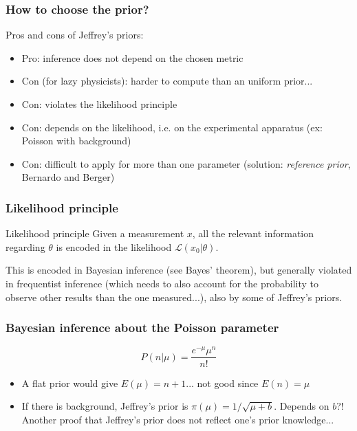 \documentclass[9pt]{beamer}
\begin{document}
\begin{frame}
 \frametitle{How to choose the prior?}
 
 Pros and cons of Jeffrey's priors:
 
 \begin{itemize}
  \item<2-> Pro: inference does not depend on the chosen metric
  \item<3-> Con (for lazy physicists): harder to compute than an uniform prior...
  \item<4-> Con: violates the likelihood principle
  \item<5-> Con: depends on the likelihood, i.e. on the experimental apparatus (ex: Poisson with background)
  \item<6-> Con: difficult to apply for more than one parameter (solution: \textit{reference prior}, Bernardo and Berger)
 \end{itemize}
 

\end{frame}

\begin{frame}
 \frametitle{Likelihood principle}
 
 \begin{block}{Likelihood principle}
  Given a measurement $x$, all the relevant information regarding $\theta$ is encoded in the likelihood $\mathcal{L}(x_0|\theta)$.
 \end{block}
 
 This is encoded in Bayesian inference (see Bayes' theorem), but generally violated in frequentist inference (which needs to also account for the probability to observe
 other results than the one measured...), also by some of Jeffrey's priors.

\end{frame}


\begin{frame}
 \frametitle{Bayesian inference about the Poisson parameter}
 
 $$P(n|\mu) = \frac{e^{-\mu} \mu^n}{n!}$$
 
 \begin{itemize}
  \item A flat prior would give $E(\mu) = n+1$... not good since $E(n)=\mu$
  \item If there is background, Jeffrey's prior is $\pi(\mu) = 1/\sqrt{\mu+b}$. Depends on $b$?! Another proof that Jeffrey's prior does not reflect one's prior knowledge...
 \end{itemize}

\end{frame}
\end{document}
